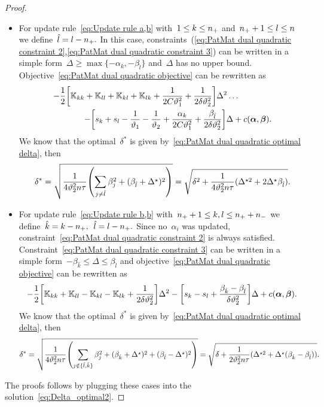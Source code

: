 \begin{proof}
\begin{itemize}
    \item For update rule~\eqref{eq:Update rule a,b} with~$1 \le k \le n_{+}$ and~$n_{+} + 1 \le l \le n$ we define~$\hat{l} = l - n_{+}.$ In this case, constraints~(\ref{eq:PatMat dual quadratic constraint 2},\ref{eq:PatMat dual quadratic constraint 3}) can be written in a simple form~$\Delta \geq \max \{- \alpha_k, - \beta_{\hat{l}}\}$ and~$\Delta$ has no upper bound. Objective~\eqref{eq:PatMat dual quadratic objective} can be rewritten as
    \begin{equation*}
      \begin{split}
        - \frac{1}{2} \Brac[s]{\K_{kk} + \K_{ll} + \K_{kl} + \K_{lk} + \frac{1}{2C\vartheta_1^2} + \frac{1}{2\delta\vartheta_2^2}} \Delta^2 \dots \qquad\qquad \\ 
        - \Brac[s]{s_k + s_l - \frac{1}{\vartheta_1} - \frac{1}{\vartheta_2} + \frac{\alpha_k}{2C\vartheta_1^2} + \frac{\beta_{\hat l}}{2\delta\vartheta_2^2}} \Delta + c(\bm{\alpha}, \bm{\beta}).
      \end{split}
    \end{equation*}
    We know that the optimal~$\delta^*$ is given by~\eqref{eq:PatMat dual quadratic optimal delta}, then
    \begin{equation*}
      \delta^*
      = \sqrt{\frac{1}{4\vartheta_2^2 n \tau} \Brac{\sum_{j\neq \hat l} \beta_j^2 + (\beta_{\hat{l}} + \Delta^\star)^2}}
      = \sqrt{\delta^2 + \frac{1}{4\vartheta_2^2 n \tau} (\Delta^{\star2} + 2\Delta^\star \beta_{\hat{l}})}.
    \end{equation*}

    \item For update rule~\eqref{eq:Update rule b,b} with~$n_{+} + 1\le k,l \le n_{+} + n_{-}$ we define~$\hat{k} = k - n_{+},$~$\hat{l} = l - n_{+}.$ Since no~$\alpha_i$ was updated, constraint~\eqref{eq:PatMat dual quadratic constraint 2} is always satisfied. Constraint~\eqref{eq:PatMat dual quadratic constraint 3} can be written in a simple form~$-\beta_{\hat{k}} \leq \Delta \leq \beta_{\hat{l}}$ and objective~\eqref{eq:PatMat dual quadratic objective} can be rewritten as
    \begin{equation*}
      - \frac{1}{2} \Brac[s]{\K_{kk} + \K_{ll} - \K_{kl} - \K_{lk} + \frac{1}{2\delta\vartheta_2^2}} \Delta^2 - \Brac[s]{s_k - s_l + \frac{\beta_{\hat{k}} - \beta_{\hat{l}}}{\delta\vartheta_2^2}} \Delta + c(\bm{\alpha}, \bm{\beta}).
    \end{equation*}
    We know that the optimal~$\delta^*$ is given by~\eqref{eq:PatMat dual quadratic optimal delta}, then
    \begin{equation*}
      \delta^*
      = \sqrt{\frac{1}{4\vartheta_2^2 n \tau} \Brac{\sum_{j \notin \{\hat{l}, \hat{k}\}} \beta_j^2 + (\beta_{\hat{k}} + \Delta^\star)^2 + (\beta_{\hat{l}} - \Delta^\star)^2}} 
      = \sqrt{\delta + \frac{1}{2\vartheta_2^2 n \tau} (\Delta^{\star2} + \Delta^\star (\beta_{\hat{k}} - \beta_{\hat{l}}))}.
    \end{equation*}
  \end{itemize}
  The proofs follows by plugging these cases into the solution~\eqref{eq:Delta_optimal2}.
\end{proof}

